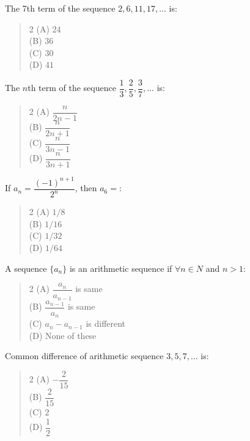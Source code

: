 \documentclass[11pt,a4paper]{article}
\begin{document}
\begin{mcqlist}
\item The 7th term of the sequence $2,6,11,17,\ldots$ is:
\begin{quote}\begin{multicols}{2}
\noindent (A) $24$ \\
(B) $36$ \\
(C) $30$ \\
(D) $41$
\end{multicols}\end{quote}

\item The $n$th term of the sequence $\dfrac{1}{3},\dfrac{2}{5},\dfrac{3}{7},\ldots$ is:
\begin{quote}\begin{multicols}{2}
\noindent (A) $\dfrac{n}{2n-1}$ \\
(B) $\dfrac{n}{2n+1}$ \\
(C) $\dfrac{n}{3n-1}$ \\
(D) $\dfrac{n}{3n+1}$
\end{multicols}\end{quote}

\item If $a_n=\dfrac{(-1)^{n+1}}{2^n}$, then $a_6=$:
\begin{quote}\begin{multicols}{2}
\noindent (A) $1/8$ \\
(B) $1/16$ \\
(C) $1/32$ \\
(D) $1/64$
\end{multicols}\end{quote}

\item A sequence $\{a_n\}$ is an arithmetic sequence if $\forall n\in N$ and $n>1$:
\begin{quote}\begin{multicols}{2}
\noindent (A) $\dfrac{a_n}{a_{n-1}}$ is same \\
(B) $\dfrac{a_{n-1}}{a_n}$ is same \\
(C) $a_n-a_{n-1}$ is different \\
(D) None of these
\end{multicols}\end{quote}

\item Common difference of arithmetic sequence $3,5,7,\ldots$ is:
\begin{quote}\begin{multicols}{2}
\noindent (A) $-\dfrac{2}{15}$ \\
(B) $\dfrac{2}{15}$ \\
(C) $2$ \\
(D) $\dfrac{1}{2}$
\end{multicols}\end{quote}


\end{mcqlist}
\end{document}
